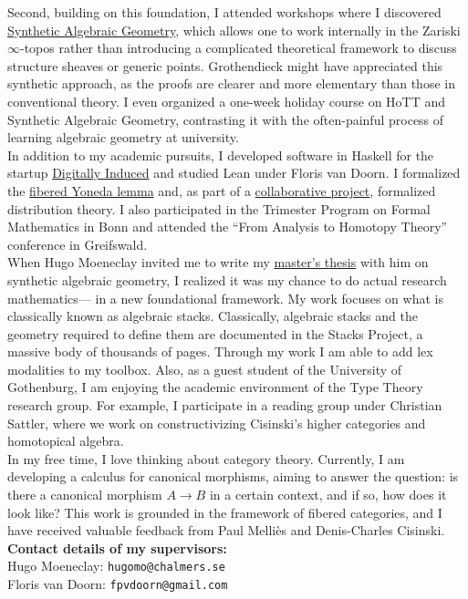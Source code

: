 \documentclass[12pt,headings=small,paper=A4,DIV=calc]{article}
\begin{document}
Second, building on this foundation, I attended workshops where I discovered \href{https://github.com/felixwellen/synthetic-zariski}{Synthetic Algebraic Geometry}, which allows one to work internally in the Zariski $\infty$-topos rather than introducing a complicated theoretical framework to discuss structure sheaves or generic points. Grothendieck might have appreciated this synthetic approach, as the proofs are clearer and more elementary than those in conventional theory. I even organized a one-week holiday course on HoTT and Synthetic Algebraic Geometry, contrasting it with the often-painful process of learning algebraic geometry at university. \\

In addition to my academic pursuits, I developed software in Haskell for the startup \href{https://www.digitallyinduced.com/}{Digitally Induced} and studied Lean under Floris van Doorn. I formalized the \href{https://github.com/timlichtnau/LeanCourse23/tree/master/LeanCourse/Project}{fibered Yoneda lemma} and, as part of a \href{https://github.com/timlichtnau/BonnAnalysis/tree/master/BonnAnalysis}{collaborative project}, formalized distribution theory. I also participated in the Trimester Program on Formal Mathematics in Bonn and attended the ``From Analysis to Homotopy Theory'' conference in Greifswald. \\

When Hugo Moeneclay invited me to write my \href{https://github.com/timlichtnau/MasterThesis/blob/Main}{master's thesis} with him on synthetic algebraic geometry, I realized it was my chance to do actual research mathematics--- in a new foundational framework. My work focuses on what is classically known as algebraic stacks. Classically, algebraic stacks and the geometry required to define them are documented in the Stacks Project, a massive body of thousands of pages. Through my work I am able to add lex modalities to my toolbox. Also, as a guest student of the University of Gothenburg, I am enjoying the academic environment of the Type Theory research group. For example, I participate in a reading group under Christian Sattler, where we work on constructivizing Cisinski's higher categories and homotopical algebra. \\

In my free time, I love thinking about category theory. Currently, I am developing a calculus for canonical morphisms, aiming to answer the question: is there a canonical morphism $A \to B$ in a certain context, and if so, how does it look like? This work is grounded in the framework of fibered categories, and I have received valuable feedback from Paul Melliès and Denis-Charles Cisinski. \\

\textbf{Contact details of my supervisors:} \\
Hugo Moeneclay: \texttt{hugomo@chalmers.se} \\
Floris van Doorn: \texttt{fpvdoorn@gmail.com}
\end{document}
